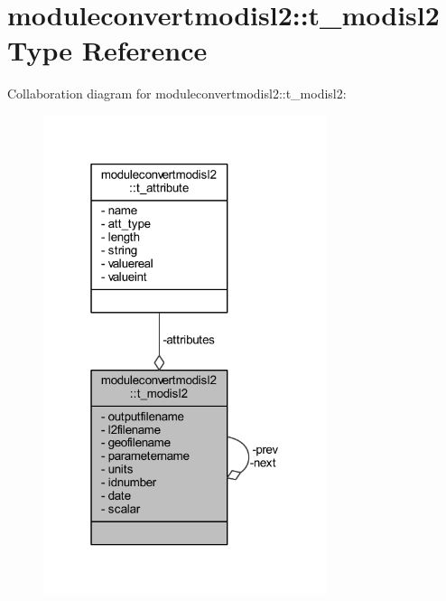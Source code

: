 \hypertarget{structmoduleconvertmodisl2_1_1t__modisl2}{}\section{moduleconvertmodisl2\+:\+:t\+\_\+modisl2 Type Reference}
\label{structmoduleconvertmodisl2_1_1t__modisl2}


Collaboration diagram for moduleconvertmodisl2\+:\+:t\+\_\+modisl2\+:\nopagebreak
\begin{figure}[H]
\begin{center}
\leavevmode
\includegraphics[width=235pt]{structmoduleconvertmodisl2_1_1t__modisl2__coll__graph}
\end{center}
\end{figure}
